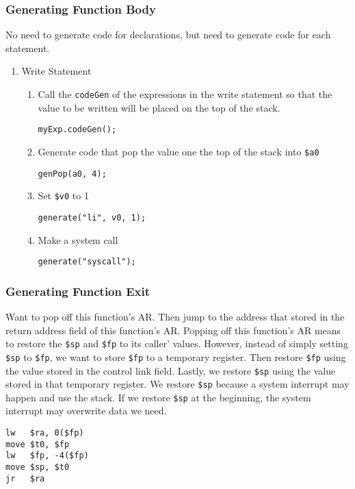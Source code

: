 \documentclass[11pt]{article}
\begin{document}
\subsubsection{Generating Function Body}
\label{sec:org6290ab8}
No need to generate code for declarations, but need to generate code for each statement.
\begin{enumerate}
\item Write Statement
\label{sec:org3250abb}
\begin{enumerate}
\item Call the \texttt{codeGen} of the expressions in the write statement so that the value to be written
will be placed on the top of the stack.
\begin{verbatim}
myExp.codeGen();
\end{verbatim}
\item Generate code that pop the value one the top of the stack into \texttt{\$a0}
\begin{verbatim}
genPop(a0, 4);
\end{verbatim}
\item Set \texttt{\$v0} to 1
\begin{verbatim}
generate("li", v0, 1);
\end{verbatim}
\item Make a system call
\begin{verbatim}
generate("syscall");
\end{verbatim}
\end{enumerate}
\end{enumerate}


\subsubsection{Generating Function Exit}
\label{sec:org462538a}
Want to pop off this function's AR. Then jump to the address that stored in the return address
field of this function's AR. Popping off this function's AR means to restore the \texttt{\$sp} and \texttt{\$fp}
to its caller' values. However, instead of simply setting \texttt{\$sp} to \texttt{\$fp}, we want to store \texttt{\$fp}
to a temporary register. Then restore \texttt{\$fp} using the value stored in the control link
field. Lastly, we restore \texttt{\$sp} using the value stored in that temporary register. We restore
\texttt{\$sp} because a system interrupt may happen and use the stack. If we restore \texttt{\$sp} at the
beginning, the system interrupt may overwrite data we need.
\begin{verbatim}
lw   $ra, 0($fp)
move $t0, $fp
lw   $fp, -4($fp) 
move $sp, $t0 
jr   $ra
\end{verbatim}
\end{document}
